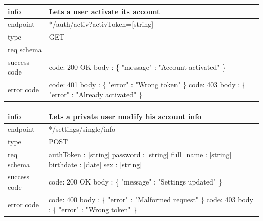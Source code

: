 \documentclass[titlepage]{article}
\begin{document}
\vspace{\baselineskip}

\begin{tabularx}{\textwidth}{lX} \hline
    info & Lets a user activate its account \\ \hline
    endpoint & */auth/activ?activToken=[string] \\ \hline
    type & GET \\ \hline
    req schema & \\ \hline
    success code &
        code: 200 OK \newline \newline 
        body : \{ \newline
        "message" : "Account activated" \newline
        \} \\ \hline
    error code &
        code: 401 \newline
        body : \{ "error" : "Wrong token" \} \newline \newline
        code: 403 \newline
        body : \{ "error" : "Already activated" \} \\ \hline
\end{tabularx}
		
\vspace{\baselineskip}

\begin{tabularx}{\textwidth}{lX} \hline
    info & Lets a private user modify his account info \\ \hline
    endpoint & */settings/single/info \\ \hline
    type & POST \\ \hline
    req schema & 
        authToken : [string] \newline
        password : [string] \newline
        full\_name : [string] \newline
        birthdate : [date] \newline
        sex : [string] \\ \hline
    success code &
        code: 200 OK \newline \newline 
        body : \{ \newline
        "message" : "Settings updated" \newline
        \} \\ \hline
    error code &
        code: 400 \newline
        body : \{ "error" : "Malformed request" \} \newline \newline
        code: 403 \newline
        body : \{ "error" : "Wrong token" \} \\ \hline
\end{tabularx}
		
\end{document}
